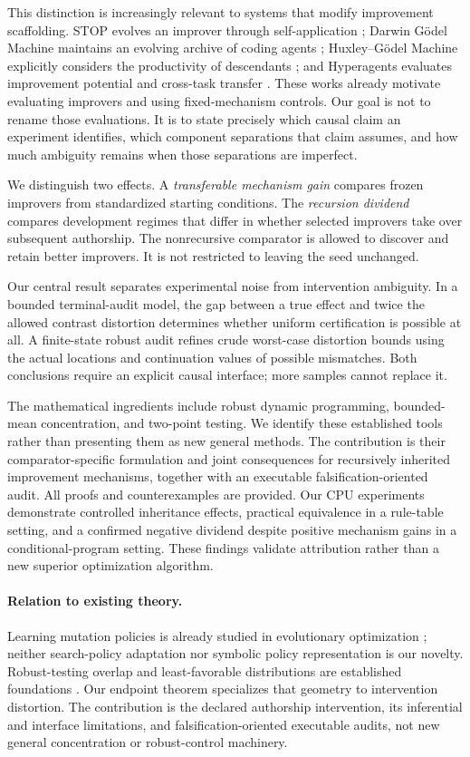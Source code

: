 \documentclass{article}
\theoremstyle{definition}
\begin{document}
This distinction is increasingly relevant to systems that modify improvement scaffolding. STOP evolves an improver through self-application \citep{stop}; Darwin G\"odel Machine maintains an evolving archive of coding agents \citep{dgm}; Huxley--G\"odel Machine explicitly considers the productivity of descendants \citep{hgm}; and Hyperagents evaluates improvement potential and cross-task transfer \citep{hyperagents}. These works already motivate evaluating improvers and using fixed-mechanism controls. Our goal is not to rename those evaluations. It is to state precisely which causal claim an experiment identifies, which component separations that claim assumes, and how much ambiguity remains when those separations are imperfect.

We distinguish two effects. A \emph{transferable mechanism gain} compares frozen improvers from standardized starting conditions. The \emph{recursion dividend} compares development regimes that differ in whether selected improvers take over subsequent authorship. The nonrecursive comparator is allowed to discover and retain better improvers. It is not restricted to leaving the seed unchanged.

Our central result separates experimental noise from intervention ambiguity. In a bounded terminal-audit model, the gap between a true effect and twice the allowed contrast distortion determines whether uniform certification is possible at all. A finite-state robust audit refines crude worst-case distortion bounds using the actual locations and continuation values of possible mismatches. Both conclusions require an explicit causal interface; more samples cannot replace it.

The mathematical ingredients include robust dynamic programming, bounded-mean concentration, and two-point testing. We identify these established tools rather than presenting them as new general methods. The contribution is their comparator-specific formulation and joint consequences for recursively inherited improvement mechanisms, together with an executable falsification-oriented audit. All proofs and counterexamples are provided. Our CPU experiments demonstrate controlled inheritance effects, practical equivalence in a rule-table setting, and a confirmed negative dividend despite positive mechanism gains in a conditional-program setting. These findings validate attribution rather than a new superior optimization algorithm.

\paragraph{Relation to existing theory.}
Learning mutation policies is already studied in evolutionary optimization \citep{mossina}; neither search-policy adaptation nor symbolic policy representation is our novelty. Robust-testing overlap and least-favorable distributions are established foundations \citep{chen,vallinayagam}. Our endpoint theorem specializes that geometry to intervention distortion. The contribution is the declared authorship intervention, its inferential and interface limitations, and falsification-oriented executable audits, not new general concentration or robust-control machinery.
\end{document}
